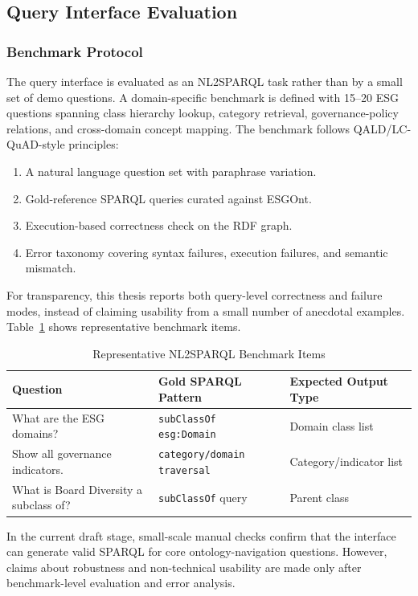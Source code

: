 \documentclass[a4paper,11pt,oneside]{article}
\begin{document}
\subsection{Query Interface Evaluation}

\subsubsection{Benchmark Protocol}

The query interface is evaluated as an NL2SPARQL task rather than by a small set of demo questions. A domain-specific benchmark is defined with 15--20 ESG questions spanning class hierarchy lookup, category retrieval, governance-policy relations, and cross-domain concept mapping. The benchmark follows QALD/LC-QuAD-style principles:
\begin{enumerate}
    \item A natural language question set with paraphrase variation.
    \item Gold-reference SPARQL queries curated against ESGOnt.
    \item Execution-based correctness check on the RDF graph.
    \item Error taxonomy covering syntax failures, execution failures, and semantic mismatch.
\end{enumerate}

For transparency, this thesis reports both query-level correctness and failure modes, instead of claiming usability from a small number of anecdotal examples. Table~\ref{tab:queries} shows representative benchmark items.

\begin{table}[h]
\centering
\caption{Representative NL2SPARQL Benchmark Items}
\label{tab:queries}
\begin{tabular}{p{5cm}p{4cm}p{4cm}}
\toprule
\textbf{Question} & \textbf{Gold SPARQL Pattern} & \textbf{Expected Output Type} \\
\midrule
What are the ESG domains? & \texttt{subClassOf esg:Domain} & Domain class list \\
Show all governance indicators. & \texttt{category/domain traversal} & Category/indicator list \\
What is Board Diversity a subclass of? & \texttt{subClassOf} query & Parent class \\
\bottomrule
\end{tabular}
\end{table}

In the current draft stage, small-scale manual checks confirm that the interface can generate valid SPARQL for core ontology-navigation questions. However, claims about robustness and non-technical usability are made only after benchmark-level evaluation and error analysis.
\end{document}
